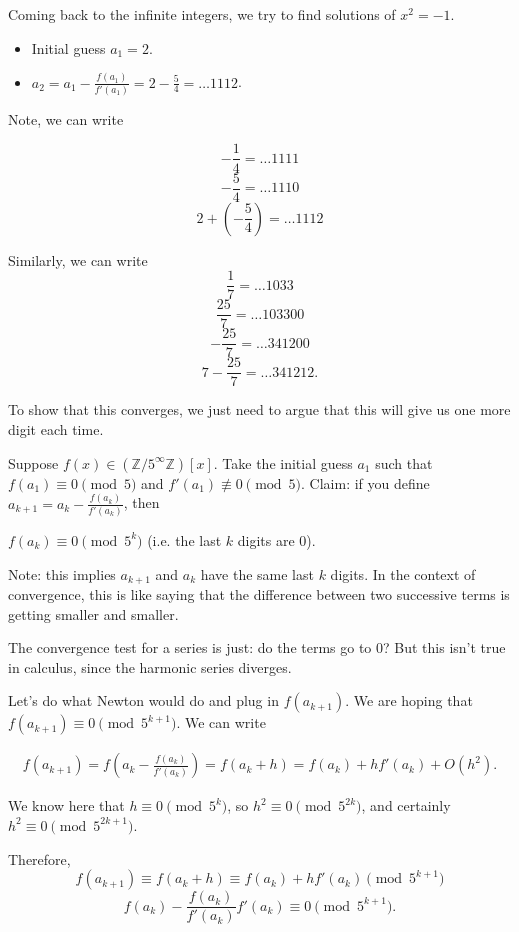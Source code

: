 \documentclass[12pt]{article}
\def\ZZ{\mathbb{Z}}
\begin{document}
  Coming back to the infinite integers, we try to find solutions of $x^2 = -1$.

  \begin{itemize}
    \item Initial guess $a_1 = 2$.
    \item $a_2 = a_1 - \frac{f(a_1)}{f'(a_1)} = 2 - \frac{5}{4} = \dots 1112$.
  \end{itemize}

  Note, we can write

  \[
    - \frac{1}{4} = \dots 1111
  \]
  \[
    - \frac{5}{4} = \dots 1110
    \]
    \[
      2 + (- \frac{5}{4}) = \dots 1112
    \]

    Similarly, we can write
    \[
      \frac{1}{7} = \dots 1033
    \]
    \[
      \frac{25}{7} = \dots 103300
    \]
    \[
      - \frac{25}{7} = \dots 341200
    \]
    \[
      7 - \frac{25}{7} = \dots 341212.
    \]

    To show that this converges, we just need to argue that this will give us one more digit each time.

    Suppose $f(x) \in (\ZZ / 5^{\infty} \ZZ)[x]$.  Take the initial guess $a_1$ such that $f(a_1) \equiv 0 \pmod{5}$ and $f'(a_1) \not \equiv 0 \pmod{5}$.  Claim: if you define $a_{k+1} = a_k - \frac{f(a_k)}{f'(a_k)}$, then

    $f(a_k) \equiv 0 \pmod{5^k}$ (i.e. the last $k$ digits are 0).

    Note: this implies $a_{k+1}$ and $a_k$ have the same last $k$ digits.  In the context of convergence, this is like saying that the difference between two successive terms is getting smaller and smaller.

    The convergence test for a series is just: do the terms go to 0?  But this isn't true in calculus, since the harmonic series diverges.

    Let's do what Newton would do and plug in $f(a_{k+1})$.  We are hoping that $f(a_{k+1}) \equiv 0 \pmod{5^{k+1}}$.  We can write

    \begin{align*}
      f(a_{k+1}) = f(a_k - \frac{f(a_k)}{f'(a_k)}) = f(a_k + h) = f(a_k) + h f'(a_k) + O(h^2).
    \end{align*}

    We know here that $h \equiv 0 \pmod{5^k}$, so $h^2 \equiv 0 \pmod{5^{2k}}$, and certainly $h^2 \equiv 0 \pmod{5^{2k+1}}$.

    Therefore, 
    \[
      f(a_{k+1}) \equiv f(a_k + h) \equiv f(a_k) + h f'(a_k) \pmod{5^{k+1}}
    \]
    \[
      f(a_k) - \frac{f(a_k)}{f'(a_k)} f'(a_k) \equiv 0 \pmod{5^{k+1}}.
      \]
\end{document}
